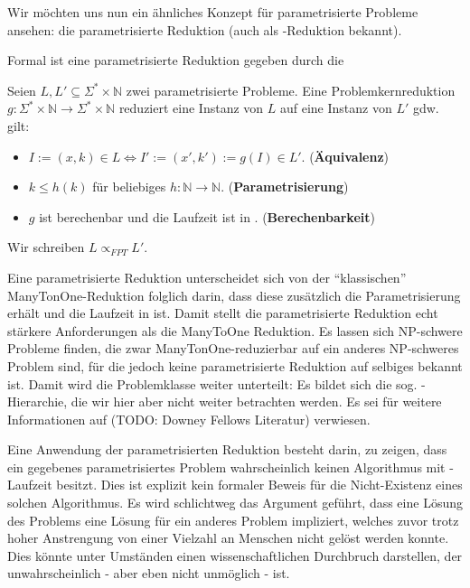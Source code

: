 \documentclass[a4paper,ngerman]{atseminar}
\newcommand{\N}{\ensuremath{\mathbb{N}}\xspace}
\begin{document}
Wir möchten uns nun ein ähnliches Konzept für parametrisierte Probleme ansehen: die parametrisierte Reduktion
(auch als \FPT-Reduktion bekannt).

\noindent
Formal ist eine parametrisierte Reduktion gegeben durch die 

\begin{definition}
  Seien $L, L' \subseteq \Sigma^* \times \N$ zwei parametrisierte Probleme.
  Eine Problemkernreduktion $g: \Sigma^* \times \N \rightarrow \Sigma^* \times \N$ reduziert eine Instanz
  von $L$ auf eine Instanz von $L'$ gdw. gilt:
  \begin{itemize}
    \item $I:= (x, k) \in L \Leftrightarrow I' := (x', k') :=g(I) \in L'$. \quad (\textbf{Äquivalenz})
    \item $k \leq h(k)$ für beliebiges $h: \N \rightarrow \N$. \quad (\textbf{Parametrisierung})
    \item $g$ ist berechenbar und die Laufzeit ist in \FPT. \quad (\textbf{Berechenbarkeit})
  \end{itemize}

  Wir schreiben $L \propto_{FPT} L'$.
\end{definition}

\noindent
Eine parametrisierte Reduktion unterscheidet sich von der \enquote{klassischen} ManyTonOne-Reduktion folglich darin,
dass diese zusätzlich die Parametrisierung erhält und die Laufzeit in \FPT\xspace ist.
Damit stellt die parametrisierte Reduktion echt stärkere Anforderungen als die ManyToOne Reduktion.
Es lassen sich NP-schwere Probleme finden, die zwar ManyTonOne-reduzierbar auf ein anderes NP-schweres Problem sind, für die jedoch
keine parametrisierte Reduktion auf selbiges bekannt ist.
Damit wird die Problemklasse \NP\xspace weiter unterteilt: Es bildet sich die sog. \W-Hierarchie, die wir hier aber nicht weiter betrachten werden.
Es sei für weitere Informationen auf (TODO: Downey Fellows Literatur) verwiesen.

\noindent
Eine Anwendung der parametrisierten Reduktion besteht darin, zu zeigen, dass ein gegebenes parametrisiertes Problem wahrscheinlich keinen
Algorithmus mit \FPT-Laufzeit besitzt.
Dies ist explizit kein formaler Beweis für die Nicht-Existenz eines solchen Algorithmus. Es wird schlichtweg das Argument geführt,
dass eine Lösung des Problems eine Lösung für ein anderes Problem impliziert, welches zuvor trotz hoher Anstrengung von einer Vielzahl
an Menschen nicht gelöst werden konnte.
Dies könnte unter Umständen einen wissenschaftlichen Durchbruch darstellen, der unwahrscheinlich - aber eben nicht unmöglich - ist. 
\end{document}
